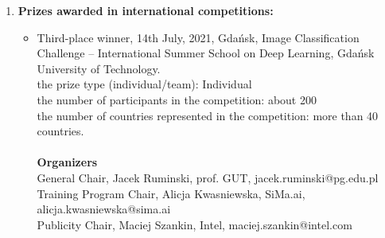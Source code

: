 \documentclass[11pt, a4paper]{article}
\begin{document}
\begin{enumerate}
\begin{itemize}
		\end{itemize} 
		\item \textbf{Prizes awarded in international competitions:}
		\begin{itemize}
			\item Third-place winner, 14th July, 2021, Gdańsk, Image Classification Challenge – International Summer School on Deep Learning, Gdańsk University of Technology. \\
			the prize type (individual/team): Individual \\
			the number of participants in the competition: about 200 \\
			the number of countries represented in the competition: more than 40 countries.  \\ \\
			\textbf{Organizers} \\
			General Chair, Jacek Ruminski, prof. GUT, jacek.ruminski@pg.edu.pl \\
			Training Program Chair, Alicja Kwasniewska, SiMa.ai, alicja.kwasniewska@sima.ai \\
			Publicity Chair, Maciej Szankin, Intel, maciej.szankin@intel.com
		\end{itemize}
	\end{enumerate}		
\end{document}
